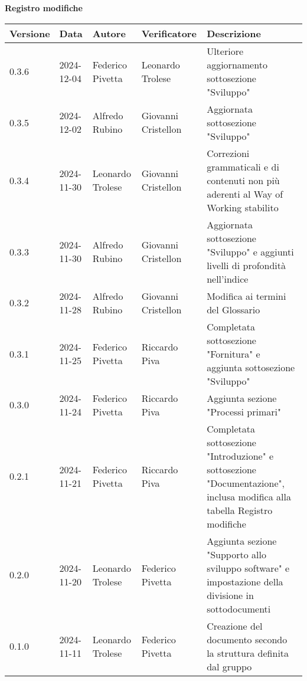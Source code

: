
\begin{center}
\textbf{Registro modifiche}\\
\vspace{2mm}

\begin{tabularx}{\textwidth}{|l|l|l|l|X|}
\hline
\textbf{Versione} & \textbf{Data} & \textbf{Autore} & \textbf{Verificatore} & \textbf{Descrizione}\\
    \hline
    0.3.6 & 2024-12-04  & Federico Pivetta & Leonardo Trolese & Ulteriore aggiornamento sottosezione "Sviluppo"\\
    \hline
    0.3.5 & 2024-12-02  & Alfredo Rubino & Giovanni Cristellon & Aggiornata sottosezione "Sviluppo"\\
    \hline
    0.3.4 & 2024-11-30  & Leonardo Trolese & Giovanni Cristellon & Correzioni grammaticali e di contenuti non più aderenti al Way of Working stabilito\\
    \hline
    0.3.3 & 2024-11-30  & Alfredo Rubino & Giovanni Cristellon & Aggiornata sottosezione "Sviluppo" e aggiunti livelli di profondità nell'indice\\
    \hline
    0.3.2 & 2024-11-28  & Alfredo Rubino & Giovanni Cristellon & Modifica ai termini del Glossario\\
    \hline
    0.3.1 & 2024-11-25  & Federico Pivetta & Riccardo Piva & Completata sottosezione "Fornitura" e aggiunta sottosezione "Sviluppo"\\
    \hline
    0.3.0 & 2024-11-24  & Federico Pivetta & Riccardo Piva & Aggiunta sezione "Processi primari"\\
    \hline
     0.2.1 & 2024-11-21  & Federico Pivetta  & Riccardo Piva& Completata sottosezione "Introduzione" e sottosezione "Documentazione", inclusa modifica alla tabella Registro modifiche\\
    \hline
    0.2.0 & 2024-11-20  & Leonardo Trolese & Federico Pivetta  & Aggiunta sezione "Supporto allo sviluppo software" e impostazione della divisione in sottodocumenti\\
    \hline
    0.1.0 & 2024-11-11  & Leonardo Trolese & Federico Pivetta  & Creazione del documento secondo la struttura definita dal gruppo\\
    \hline
\end{tabularx}
\end{center}